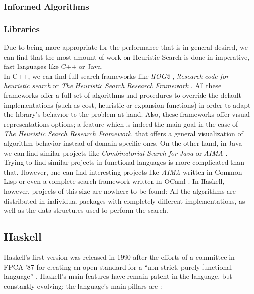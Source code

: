 \subsubsection{Informed Algorithms}

\subsubsection{Libraries}

Due to being more appropriate for the performance that is in general desired,
we can find that the most amount of work on Heuristic Search is done in
imperative, fast languages like C++ or Java.\\

In C++, we can find full search frameworks like \emph{HOG2} \cite{hog2},
\emph{Research code for heuristic search} \cite{cpp-search} or \emph{The
  Heuristic Search Research Framework} \cite{goldenberg-2017-framework}. All
these frameworks offer a full set of algorithms and procedures to override the
default implementations (such as cost, heuristic or expansion functions) in
order to adapt the library's behavior to the problem at hand. Also, these
frameworks offer visual representations options; a feature which is indeed the
main goal in the case of \emph{The Heuristic Search Research Framework}, that
offers a general visualization of algorithm behavior instead of domain specific
ones. On the other hand, in Java we can find similar projects like
\emph{Combinatorial Search for Java} \cite{cs4j} or \emph{AIMA}
\cite{java-aima}.\\

Trying to find similar projects in functional languages is more complicated
than that. However, one can find interesting projects like \emph{AIMA} written
in Common Lisp \cite{lisp-aima} or even a complete search framework written in
OCaml \cite{ocaml-search}. In Haskell, however, projects of this size are
nowhere to be found: All the algorithms are distributed in individual packages
with completely different implementations, as well as the data structures used
to perform the search.


\subsection{Haskell}

Haskell's first version was released in 1990 after the efforts of a committee
in FPCA '87 for creating an open standard for a ``non-strict, purely functional
language'' \cite{haskell-history}. Haskell's main features have remain patent
in the language, but constantly evolving: the language's main pillars are
\cite{haskell-98, haskell-2010}:

